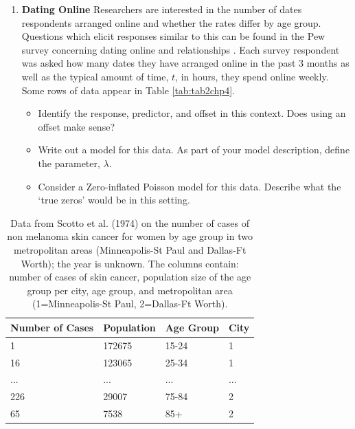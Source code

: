 \documentclass[
]{krantz}
\providecommand{\tightlist}{%
  \setlength{\itemsep}{0pt}\setlength{\parskip}{0pt}}
\begin{document}
\begin{enumerate}
\def\labelenumi{\arabic{enumi}.}
\setcounter{enumi}{14}
\item
  \textbf{Dating Online} Researchers are interested in the number of dates respondents arranged online and whether the rates differ by age group. Questions which elicit responses similar to this can be found in the Pew survey concerning dating online and relationships \citep{Duggan2013}. Each survey respondent was asked how many dates they have arranged online in the past 3 months as well as the typical amount of time, \(t\), in hours, they spend online weekly. Some rows of data appear in Table \ref{tab:tab2chp4}.

  \begin{itemize}
  \tightlist
  \item
    Identify the response, predictor, and offset in this context. Does using an offset make sense?
  \item
    Write out a model for this data. As part of your model description, define the parameter, \(\lambda\).
  \item
    Consider a Zero-inflated Poisson model for this data. Describe what the `true zeros' would be in this setting.
  \end{itemize}
\end{enumerate}

\begin{table}

\caption{\label{tab:tab3chp4}Data from Scotto et al. (1974) on the number of cases of non melanoma skin cancer for women by age group in two metropolitan areas (Minneapolis-St Paul and Dallas-Ft Worth); the year is unknown. The columns contain: number of cases of skin cancer, population size of the age group per city, age group, and metropolitan area (1=Minneapolis-St Paul, 2=Dallas-Ft Worth).}
\centering
\begin{tabular}[t]{llll}
\toprule
Number of Cases & Population & Age Group & City\\
\midrule
1 & 172675 & 15-24 & 1\\
16 & 123065 & 25-34 & 1\\
... & ... & ... & ...\\
226 & 29007 & 75-84 & 2\\
65 & 7538 & 85+ & 2\\
\bottomrule
\end{tabular}
\end{table}
\end{document}
